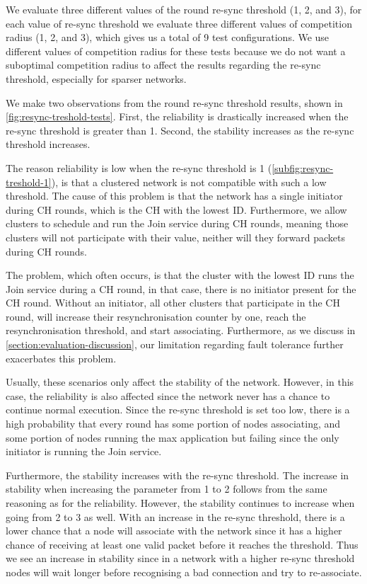 We evaluate three different values of the round re-sync threshold (1, 2, and 3), for each value of re-sync threshold we evaluate three different values of competition radius (1, 2, and 3), which gives us a total of 9 test configurations. We use different values of competition radius for these tests because we do not want a suboptimal competition radius to affect the results regarding the re-sync threshold, especially for sparser networks.

\begin{newtext}
We make two observations from the round re-sync threshold results, shown in \cref{fig:resync-treshold-tests}. First, the reliability is drastically increased when the re-sync threshold is greater than 1. Second, the stability increases as the re-sync threshold increases. 

The reason reliability is low when the re-sync threshold is 1 (\cref{subfig:resync-treshold-1}), is that a clustered network is not compatible with such a low threshold. The cause of this problem is that the network has a single initiator during CH rounds, which is the CH with the lowest ID. Furthermore, we allow clusters to schedule and run the Join service during CH rounds, meaning those clusters will not participate with their value, neither will they forward packets during CH rounds. 

The problem, which often occurs, is that the cluster with the lowest ID runs the Join service during a CH round, in that case, there is no initiator present for the CH round. Without an initiator, all other clusters that participate in the CH round, will increase their resynchronisation counter by one, reach the resynchronisation threshold, and start associating. Furthermore, as we discuss in \cref{section:evaluation-discussion}, our limitation regarding fault tolerance further exacerbates this problem.

Usually, these scenarios only affect the stability of the network. However, in this case, the reliability is also affected since the network never has a chance to continue normal execution. Since the re-sync threshold is set too low, there is a high probability that every round has some portion of nodes associating, and some portion of nodes running the max application but failing since the only initiator is running the Join service.

\end{newtext}

\begin{newtext}
Furthermore, the stability increases with the re-sync threshold. The increase in stability when increasing the parameter from 1 to 2 follows from the same reasoning as for the reliability. However, the stability continues to increase when going from 2 to 3 as well. With an increase in the re-sync threshold, there is a lower chance that a node will associate with the network since it has a higher chance of receiving at least one valid packet before it reaches the threshold. Thus we see an increase in stability since in a network with a higher re-sync threshold nodes will wait longer before recognising a bad connection and try to re-associate.
\end{newtext}


